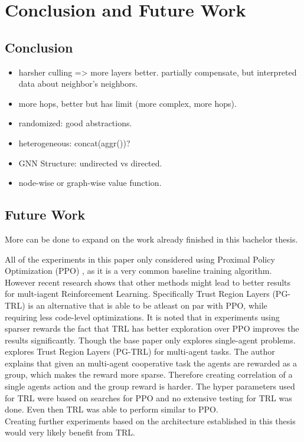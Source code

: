
\chapter{Conclusion and Future Work}
\label{ch:Conclusion}

\section{Conclusion}
\begin{itemize}[noitemsep,nolistsep]
	\item harsher culling => more layers better. partially compensate, but interpreted data about neighbor's neighbors.
	\item more hops, better but has limit (more complex, more hops).
	\item randomized: good abstractions.
	\item heterogeneous: concat(aggr())?
	\item GNN Structure: undirected vs directed.
	\item node-wise or graph-wise value function.
\end{itemize}


\section{Future Work}
More can be done to expand on the work already finished in this bachelor thesis.\par

All of the experiments in this paper only considered using Proximal Policy Optimization (PPO) \citet{SchulmanWDRK17}, as it is a very common baseline training algorithm.
However recent research shows that other methods might lead to better results for mult-iagent Reinforcement Learning.
Specifically Trust Region Layers (PG-TRL) \citet{otto2021differentiable} is an alternative that is able to be atleast on par with PPO, while requiring less code-level optimizations. It is noted that in experiments using sparser rewards the fact that TRL has better exploration over PPO improves the results significantly. Though the base paper only explores single-agent problems.\\
\citet{RobinRuede2021} explores Trust Region Layers (PG-TRL) \citet{otto2021differentiable} for multi-agent tasks. The author explains that given an multi-agent cooperative task the agents are rewarded as a group, which makes the reward more sparse. Therefore creating correlation of a single agents action and the group reward is harder. The hyper parameters used for TRL were based on searches for PPO and no extensive testing for TRL was done. Even then TRL was able to perform similar to PPO.\\
Creating further experiments based on the architecture established in this thesis would very likely benefit from TRL. \par

